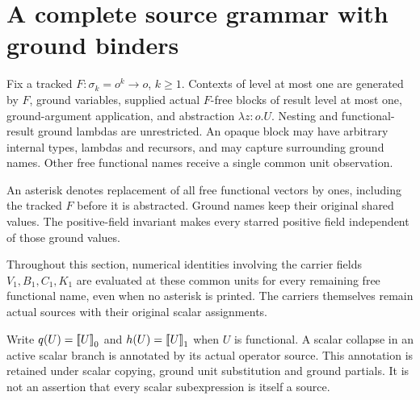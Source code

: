\section{A complete source grammar with ground binders}\label{sec:ground-binders}

Fix a tracked $F:\sigma_k=o^k\to o$, $k\ge1$.  Contexts of level at most
one are generated by $F$, ground variables, supplied actual $F$-free blocks
of result level at most one, ground-argument application, and abstraction
$\lambda z:o.U$.  Nesting and functional-result ground lambdas are unrestricted.
An opaque block may have arbitrary internal types, lambdas and recursors,
and may capture surrounding ground names.  Other free functional names
receive a single common unit observation.

An asterisk denotes replacement of all free functional vectors by ones,
including the tracked $F$ before it is abstracted. Ground names keep
their original shared values. The positive-field invariant makes every
starred positive field independent of those ground values.

Throughout this section, numerical identities involving the carrier fields
$V_1,B_1,C_1,K_1$ are evaluated at these common units for every remaining
free functional name, even when no asterisk is printed.  The carriers
themselves remain actual sources with their original scalar assignments.

Write $q(U)=\mathopen{[\![}U\mathclose{]\!]}_0$ and $h(U)=\mathopen{[\![}U\mathclose{]\!]}_1$ when $U$ is functional.
A scalar collapse in an active scalar branch is annotated by its actual
operator source.  This annotation is retained under scalar copying, ground
unit substitution and ground partials.  It is not an assertion that every
scalar subexpression is itself a source.

